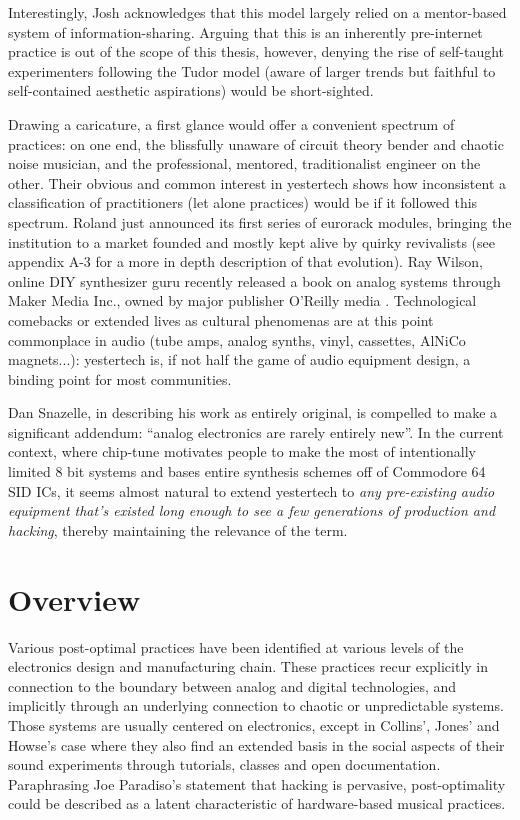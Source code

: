 Interestingly, Josh acknowledges that this model largely relied on a mentor-based system of information-sharing. Arguing that this is an inherently pre-internet practice is out of the scope of this thesis, however, denying the rise of self-taught experimenters following the Tudor model (aware of larger trends but faithful to self-contained aesthetic aspirations) would be short-sighted. 

Drawing a caricature, a first glance would offer a convenient spectrum of practices: on one end, the blissfully unaware of circuit theory bender and chaotic noise musician, and the professional, mentored, traditionalist engineer on the other. Their obvious and common interest in yestertech shows how inconsistent a classification of practitioners (let alone practices) would be if it followed this spectrum. Roland just announced its first series of eurorack modules\citep{factmag2015}, bringing the institution to a market founded and mostly kept alive by quirky revivalists (see appendix A-3 for a more in depth description of that evolution). Ray Wilson, online DIY synthesizer guru recently released a book on analog systems through Maker Media Inc., owned by major publisher O'Reilly media \citep{wilson2013}. Technological comebacks or extended lives as cultural phenomenas are at this point commonplace in audio (tube amps, analog synths, vinyl, cassettes, AlNiCo magnets...): yestertech is, if not half the game of audio equipment design, a binding point for most communities. 

Dan Snazelle, in describing his work as entirely original, is compelled to make a significant addendum: ``analog electronics are rarely entirely new''. In the current context, where chip-tune motivates people to make the most of intentionally limited 8 bit systems and bases entire synthesis schemes off of Commodore 64 SID ICs, it seems almost natural to extend yestertech to \emph{any pre-existing audio equipment that's existed long enough to see a few generations of production and hacking}, thereby maintaining the relevance of the term.

\section{Overview} 

 Various post-optimal practices have been identified at various levels of the electronics design and manufacturing chain. These practices recur explicitly in connection to the boundary between analog and digital technologies, and implicitly through an underlying connection to chaotic or unpredictable systems. Those systems are usually centered on electronics, except in Collins', Jones' and Howse's case where they also find an extended basis in the social aspects of their sound experiments through tutorials, classes and open documentation. Paraphrasing Joe Paradiso's statement that hacking is pervasive, post-optimality could be described as a latent characteristic of hardware-based musical practices.


